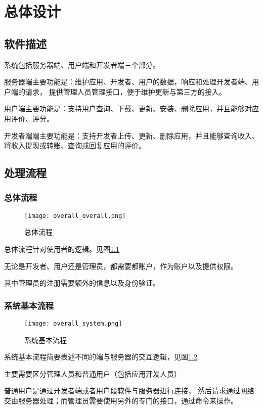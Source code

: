 \chapter{总体设计}
\section{软件描述}
系统包括服务器端、用户端和开发者端三个部分。

服务器端主要功能是：维护应用、开发者、用户的数据，响应和处理开发者端、用户端的请求，
提供管理人员管理接口，便于维护更新与第三方的接入。

用户端主要功能是：支持用户查询、下载、更新、安装、删除应用，并且能够对应用评价、评分。

开发者端端主要功能是：支持开发者上传、更新、删除应用，并且能够查询收入、将收入提现或转账、查询或回复应用的评价。

\section{处理流程}
\subsection{总体流程}
\begin{figure}[ht]
	\centering
	\texttt{[image: overall\_overall.png]}
	\caption{总体流程} \label{fig:overall_overall.png}
\end{figure}

总体流程针对使用者的逻辑。见图\ref{fig:overall_overall.png}

无论是开发者、用户还是管理员，都需要都账户，作为账户以及提供权限。

其中管理员的注册需要额外的信息以及身份验证。

\subsection{系统基本流程}
\begin{figure}[ht]
	\centering
	\texttt{[image: overall\_system.png]}
	\caption{系统基本流程} \label{fig:overall_system.png}
\end{figure}

系统基本流程简要表述不同的端与服务器的交互逻辑，见图\ref{fig:overall_system.png}.

主要需要区分管理人员和普通用户（包括应用开发人员）

普通用户是通过开发者端或者用户段软件与服务器进行连接，
然后请求通过网络交由服务器处理；而管理员需要使用另外的专门的接口，通过命令来操作。

